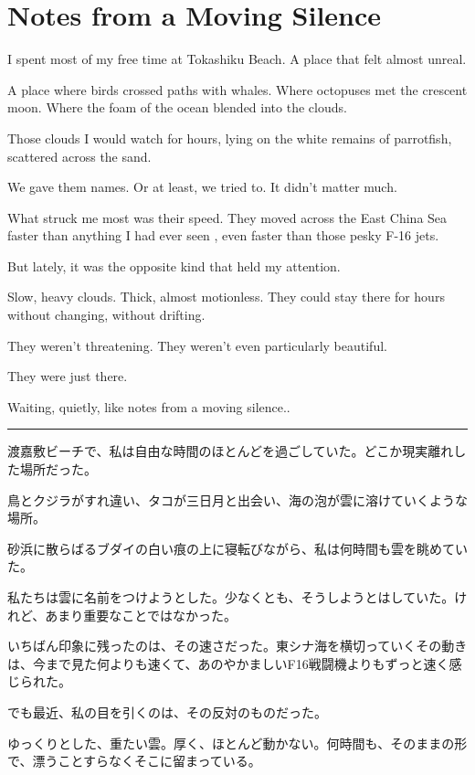 \documentclass[
  letterpaper,
  oneside]{scrbook}
\begin{document}
\chapter{Notes from a Moving Silence}\label{notes-from-a-moving-silence}

I spent most of my free time at Tokashiku Beach. A place that felt
almost unreal.

A place where birds crossed paths with whales. Where octopuses met the
crescent moon. Where the foam of the ocean blended into the clouds.

Those clouds I would watch for hours, lying on the white remains of
parrotfish, scattered across the sand.

We gave them names. Or at least, we tried to. It didn't matter much.

What struck me most was their speed. They moved across the East China
Sea faster than anything I had ever seen , even faster than those pesky
F-16 jets.

But lately, it was the opposite kind that held my attention.

Slow, heavy clouds. Thick, almost motionless. They could stay there for
hours without changing, without drifting.

They weren't threatening. They weren't even particularly beautiful.

They were just there.

Waiting, quietly, like notes from a moving silence..

\begin{center}\rule{0.5\linewidth}{0.5pt}\end{center}

渡嘉敷ビーチで、私は自由な時間のほとんどを過ごしていた。どこか現実離れした場所だった。

鳥とクジラがすれ違い、タコが三日月と出会い、海の泡が雲に溶けていくような場所。

砂浜に散らばるブダイの白い痕の上に寝転びながら、私は何時間も雲を眺めていた。

私たちは雲に名前をつけようとした。少なくとも、そうしようとはしていた。けれど、あまり重要なことではなかった。

いちばん印象に残ったのは、その速さだった。東シナ海を横切っていくその動きは、今まで見た何よりも速くて、あのやかましいF16戦闘機よりもずっと速く感じられた。

でも最近、私の目を引くのは、その反対のものだった。

ゆっくりとした、重たい雲。厚く、ほとんど動かない。何時間も、そのままの形で、漂うことすらなくそこに留まっている。
\end{document}
